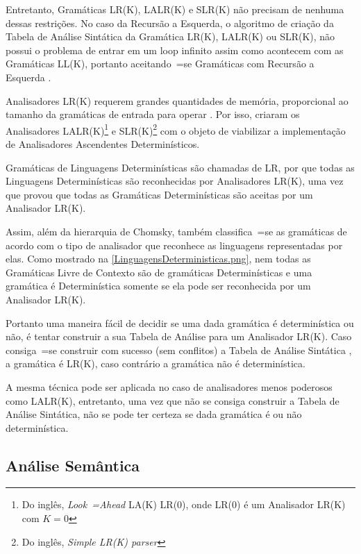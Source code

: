     Entretanto,
    Gramáticas LR(K), LALR(K) e
    SLR(K) não precisam de nenhuma dessas restrições.
    No caso da Recursão a Esquerda,
    o algoritmo de criação da Tabela de Análise Sintática da Gramática LR(K),
    LALR(K) ou SLR(K),
    não possui o problema de entrar em um loop infinito assim como acontecem com as Gramáticas LL(K),
    portanto aceitando~=se Gramáticas com Recursão a Esquerda \cite{ahoCompilerDragonBook}.

    Analisadores LR(K) requerem grandes quantidades de memória,
    proporcional ao tamanho da gramáticas de entrada para operar \cite{complexityOfLRKTesting}.
    Por isso,
     criaram os Analisadores LALR(K)\footnote{
    Do inglês, \textit{Look~=Ahead} LA(K) LR(0),
    onde LR(0) é um Analisador LR(K) com $K=0$
    }
    e SLR(K)\footnote{
    Do inglês, \textit{Simple LR(K) parser}
    }
    com o objeto de viabilizar a implementação de Analisadores Ascendentes Determinísticos.

    Gramáticas de Linguagens Determinísticas são chamadas de LR,
    por que todas as Linguagens Determinísticas são reconhecidas por Analisadores LR(K),
    uma vez que  provou que todas as Gramáticas Determinísticas são aceitas por um Analisador LR(K).

    Assim,
    além da hierarquia de Chomsky,
    também classifica~=se as gramáticas de acordo com o tipo de analisador que reconhece as linguagens representadas por elas.
    Como mostrado na \autoref{LinguagensDeterministicas.png},
    nem todas as Gramáticas Livre de Contexto são de gramáticas Determinísticas e
    uma gramática é Determinística somente se ela pode ser reconhecida por um Analisador LR(K).

    Portanto uma maneira fácil de decidir se uma dada gramática é determinística ou
    não,
    é tentar construir a sua Tabela de Análise para um Analisador LR(K).
    Caso consiga~=se construir com sucesso (sem conflitos) a Tabela de Análise Sintática \cite{ahoCompilerDragonBook},
    a gramática é LR(K),
    caso contrário a gramática não é determinística.

    A mesma técnica pode ser aplicada no caso de analisadores menos poderosos como LALR(K),
    entretanto,
    uma vez que não se consiga construir a Tabela de Análise Sintática,
    não se pode ter certeza se dada gramática é ou não determinística.


\subsection{Análise Semântica}
\label{analiseSemantica}

